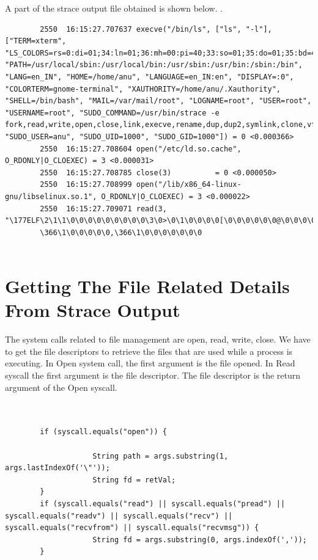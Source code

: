 \documentclass[12pt]{report}
\begin{document}
A part of the strace output file obtained is shown below.        .  
\begin{lstlisting}
        2550  16:15:27.707637 execve("/bin/ls", ["ls", "-l"], ["TERM=xterm",        "LS_COLORS=rs=0:di=01;34:ln=01;36:mh=00:pi=40;33:so=01;35:do=01;35:bd=40;33;01:cd=40;33;01:or=40;31;01:su=37;41:sg=30;43:ca=30;41:tw=30;42:ow=34;42:st=37;44:ex=01;32:*.tar=01;31:*.tgz=01;31:*.arj=01;31"...,  "PATH=/usr/local/sbin:/usr/local/bin:/usr/sbin:/usr/bin:/sbin:/bin", "LANG=en_IN", "HOME=/home/anu", "LANGUAGE=en_IN:en", "DISPLAY=:0", "COLORTERM=gnome-terminal", "XAUTHORITY=/home/anu/.Xauthority", "SHELL=/bin/bash", "MAIL=/var/mail/root", "LOGNAME=root", "USER=root", "USERNAME=root", "SUDO_COMMAND=/usr/bin/strace -e fork,read,write,open,close,link,execve,rename,dup,dup2,symlink,clone,vfork,setuid32,setgid32,chmod,fchmod,pipe,truncate,ftruncate,readv,recv,recvfrom,recvmsg,send,sendt"..., "SUDO_USER=anu", "SUDO_UID=1000", "SUDO_GID=1000"]) = 0 <0.000366>
        2550  16:15:27.708604 open("/etc/ld.so.cache", O_RDONLY|O_CLOEXEC) = 3 <0.000031>
        2550  16:15:27.708785 close(3)          = 0 <0.000050>
        2550  16:15:27.708999 open("/lib/x86_64-linux-gnu/libselinux.so.1", O_RDONLY|O_CLOEXEC) = 3 <0.000022>
        2550  16:15:27.709071 read(3, "\177ELF\2\1\1\0\0\0\0\0\0\0\0\0\3\0>\0\1\0\0\0\0[\0\0\0\0\0\0@\0\0\0\0\0\0\0X\5\2\0\0\0\0\0\0\0\0\0@\0008\0\10\0@\0\35\0\34\0\1\0\0\0\5\0\0\0\0\0\0\0\0\0\0\0\0\0\0\0\0\0\0\0\0\0\0\0\0\0\0\0,
        \366\1\0\0\0\0\0,\366\1\0\0\0\0\0\0\0 
     
\end{lstlisting}


\section{Getting The File Related Details From Strace Output}

The system calls related to file management are open, read, write, close. We have to get the file descriptors to retrieve the files that are used while a process is executing. In Open system call, the first argument is the file opened. In Read syscall the first argument is the file descriptor. The file descriptor is the return argument of the Open syscall. 
\begin{lstlisting}


        if (syscall.equals("open")) {
                   
                    String path = args.substring(1, args.lastIndexOf('\"'));
                    String fd = retVal;
        }
        if (syscall.equals("read") || syscall.equals("pread") || syscall.equals("readv") || syscall.equals("recv") || syscall.equals("recvfrom") || syscall.equals("recvmsg")) {
                    String fd = args.substring(0, args.indexOf(','));
        }
\end{lstlisting}
\end{document}
